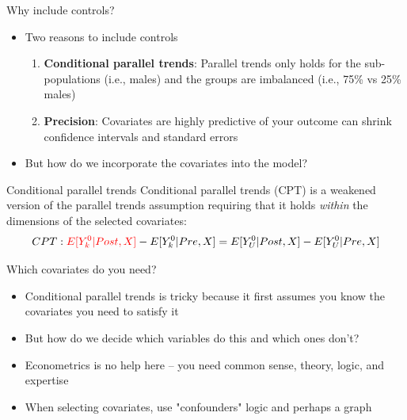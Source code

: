 \documentclass{beamer}
\begin{document}
\begin{frame}{Why include controls?}

\begin{itemize}
\item Two reasons to include controls
	\begin{enumerate}
	\item \textbf{Conditional parallel trends}: Parallel trends only holds for the sub-populations (i.e., males) and the groups are imbalanced (i.e., 75\% vs 25\% males)
	\item \textbf{Precision}: Covariates are highly predictive of your outcome can shrink confidence intervals and standard errors
	\end{enumerate}
\item But how do we incorporate the covariates into the model? 
\end{itemize}

\end{frame}



\begin{frame}{Conditional parallel trends}
Conditional parallel trends (CPT) is a weakened version of the parallel trends assumption requiring that it holds \emph{within} the dimensions of the selected covariates:
\begin{align*}
CPT: \textcolor{red}{E[Y^0_k|Post, X]} - E[Y^0_k|Pre, X] = E[Y^0_U|Post, X] - E[Y^0_U|Pre, X]
\end{align*}
\end{frame}




\begin{frame}{Which covariates do you need?}

\begin{itemize}
\item Conditional parallel trends is tricky because it first assumes you know the covariates you need to satisfy it
\item But how do we decide which variables do this and which ones don't?
\item Econometrics is no help here -- you need common sense, theory, logic, and expertise
\item When selecting covariates, use "confounders" logic and perhaps a graph
\end{itemize}

\end{frame}
	
\end{document}
